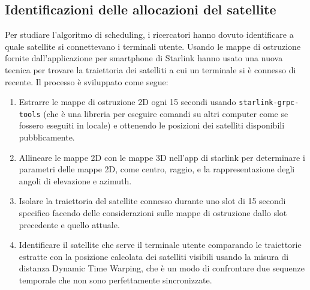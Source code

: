 \subsection{Identificazioni delle allocazioni del satellite}
Per studiare l'algoritmo di scheduling, i ricercatori hanno dovuto identificare a quale satellite si connettevano i terminali utente.
Usando le mappe di ostruzione fornite dall'applicazione per smartphone di Starlink hanno usato una nuova tecnica per trovare la traiettoria dei satelliti a cui un terminale si è connesso di recente.
Il processo è sviluppato come segue:
\begin{enumerate}
  \item Estrarre le mappe di ostruzione 2D ogni 15 secondi usando \verb|starlink-grpc-tools| (che è una libreria per eseguire comandi su altri computer come se fossero eseguiti in locale) e ottenendo le posizioni dei satelliti disponibili pubblicamente.
  \item Allineare le mappe 2D con le mappe 3D nell'app di starlink per determinare i parametri delle mappe 2D, come centro, raggio, e la rappresentazione degli angoli di elevazione e azimuth.
  \item Isolare la traiettoria del satellite connesso durante uno slot di 15 secondi specifico facendo delle considerazioni sulle mappe di ostruzione dallo slot precedente e quello attuale.
  \item Identificare il satellite che serve il terminale utente comparando le traiettorie estratte con la posizione calcolata dei satelliti visibili usando la misura di distanza Dynamic Time Warping, che è un modo di confrontare due sequenze temporale che non sono perfettamente sincronizzate.
\end{enumerate}

